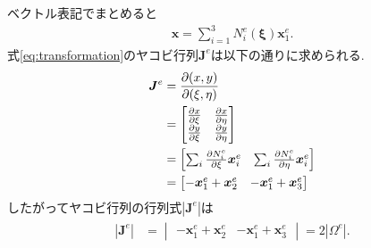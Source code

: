 \documentclass[paper=a4]{jlreq}
\begin{document}
ベクトル表記でまとめると
\begin{align}
    \bm{x} = \sum_{i=1}^3 N^e_i(\bm{\xi})\bm{x}^e_1. \label{eq:transformation}
\end{align}
式\eqref{eq:transformation}のヤコビ行列$\bm{J}^e$は以下の通りに求められる.
\begin{align}
    \begin{split}
        \bm{J}^e &= \pdv{(x,y)}{(\xi,\eta)}\\
        &= 
        \begin{bmatrix}
            \pdv{x}{\xi} & \pdv{x}{\eta} \\
            \pdv{y}{\xi} & \pdv{y}{\eta} 
        \end{bmatrix}\\
        &=
        \begin{bmatrix}
            \sum_i\pdv{N^e_i}{\xi}\bm{x}^e_i & \sum_i\pdv{N^e_i}{\eta}\bm{x}^e_i
        \end{bmatrix} \\
        &=
        \begin{bmatrix}
            -\bm{x}^e_1+\bm{x}^e_2 & -\bm{x}^e_1+\bm{x}^e_3
        \end{bmatrix}
    \end{split}
\end{align}
したがってヤコビ行列の行列式$|\bm{J}^e|$は
\begin{align}
    \begin{split}
        |\bm{J}^e| &=
        \begin{vmatrix}
            -\bm{x}^e_1+\bm{x}^e_2 & -\bm{x}^e_1+\bm{x}^e_3
        \end{vmatrix} = 2|\Omega^e|.
        \label{eq:jacobian:determinant}
    \end{split}
\end{align}
\end{document}
